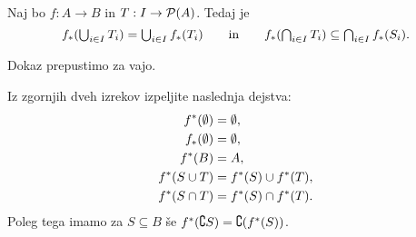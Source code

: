 \begin{izrek}
  Naj bo $f : A \to B$ in $T : I \to \mathcal{P}(A)$. Tedaj je
  \begin{equation*}
    \textstyle
     f_{*} (\bigcup_{i \in I} T_i) = \bigcup_{i \in I} f_{*}(T_i)
     \qquad\text{in}\qquad
     f_{*} (\bigcap_{i \in I} T_i) \subseteq \bigcap_{i \in I} f_{*}(S_i).
  \end{equation*}
\end{izrek}

\begin{dokaz}
  Dokaz prepustimo za vajo.
\end{dokaz}

\begin{naloga}
  Iz zgornjih dveh izrekov izpeljite naslednja dejstva:
  \begin{align*}
    f^{*}(\emptyset) &= \emptyset, \\
    f_{*}(\emptyset) &= \emptyset, \\
    f^{*}(B) &= A, \\
    f^{*}(S \cup T) &= f^{*}(S) \cup f^{*}(T), \\
    f^{*}(S \cap T) &= f^{*}(S) \cap f^{*}(T).
  \end{align*}
  Poleg tega imamo za $S \subseteq B$ še $f^{*}(\complement{S}) = \complement{(f^{*}(S))}$.
\end{naloga}